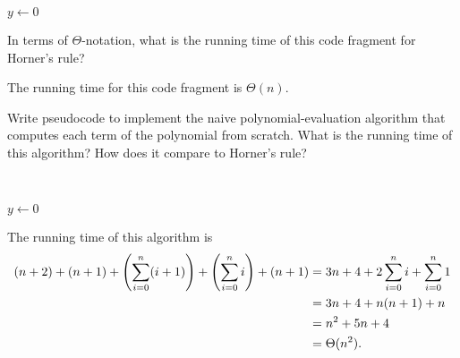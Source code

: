 \documentclass[Chapter02]{subfiles}
\begin{document}
\begin{problems}
		\begin{algorithm}[H]
			$y \leftarrow 0$\;
		\end{algorithm}
		\begin{problems}
			\item In terms of $\Theta$-notation, what is the running time of this code fragment for Horner's rule?
			\begin{answer}
				The running time for this code fragment is $\Theta(n)$.
			\end{answer}

			\item Write pseudocode to implement the naive polynomial-evaluation algorithm that computes each term of the polynomial from scratch. What is the running time of this algorithm? How does it compare to Horner's rule?
			\begin{answer}
				\hfill\\
				\begin{algorithm}[H]
					$y \leftarrow 0$\;
				\end{algorithm}

				The running time of this algorithm is
				\begin{align*}
					(n + 2) + (n + 1) + \qty(\sum_{i = 0}^n (i + 1)) + \qty(\sum_{i = 0}^n i) + (n + 1) &= 3n + 4 + 2\sum_{i = 0}^n i + \sum_{i = 0}^n 1\\
						&= 3n + 4 + n(n + 1) + n\\
						&= n^2 + 5n + 4\\
						&= \Theta(n^2).
				\end{align*}
			\end{answer}
			

\end{problems}
\end{problems}
\end{document}
